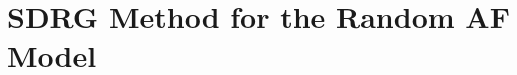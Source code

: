 \documentclass[../main.tex]{subfiles}
\begin{document}
\chapter{SDRG Method for the Random AF Model}










\end{document}
